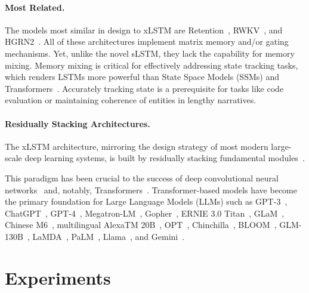 \paragraph{Most Related.} The models most similar in design to xLSTM are Retention~\citep{Sun:23arxiv}, RWKV~\citep{Peng:23arxivshort,Peng:24arxivshort}, and HGRN2~\citep{Qin:24arxiv}. All of these architectures implement matrix memory and/or gating mechanisms. Yet, unlike the novel sLSTM, they lack the capability for memory mixing. Memory mixing is critical for effectively addressing state tracking tasks, which renders LSTMs more powerful than State Space Models (SSMs) and Transformers~\citep{Merrill:24,Deletang:23}. Accurately tracking state is a prerequisite for tasks like code evaluation or maintaining coherence of entities in lengthy narratives.

\paragraph{Residually Stacking Architectures.} The xLSTM architecture, mirroring the design strategy of most modern large-scale deep learning systems, is built by residually stacking fundamental modules~\citep{Srivastava:15,He:16}.

This paradigm has been crucial to the success of deep convolutional neural networks~\citep{He:16} and, notably, Transformers~\citep{Vaswani:17}. Transformer-based models have become the primary foundation for Large Language Models (LLMs) such as GPT-3~\citep{Brown:20short}, ChatGPT~\citep{Schulman:22short}, GPT-4~\citep{Achiam:23gpt4short}, Megatron-LM~\citep{Shoeybi:19}, Gopher~\citep{Rae:21short}, ERNIE 3.0 Titan~\citep{Wang:21arxivshort}, GLaM~\citep{Du:21glamshort}, Chinese M6~\citep{Lin:21}, multilingual AlexaTM 20B~\citep{Soltan:22}, OPT~\citep{Zhang:22opt}, Chinchilla~\citep{Hoffmann:22short}, BLOOM~\citep{Scao:22arxivshort}, GLM-130B~\citep{Zeng:22arxivshort}, LaMDA~\citep{Thoppilan:22short}, PaLM~\citep{Chowdhery:22short}, Llama~\citep{Touvron:23arxiv}, and Gemini~\citep{GeminiTeam:23arxiv,Reid:24arxiv}.

\section{Experiments}
\label{sec:Exp}

